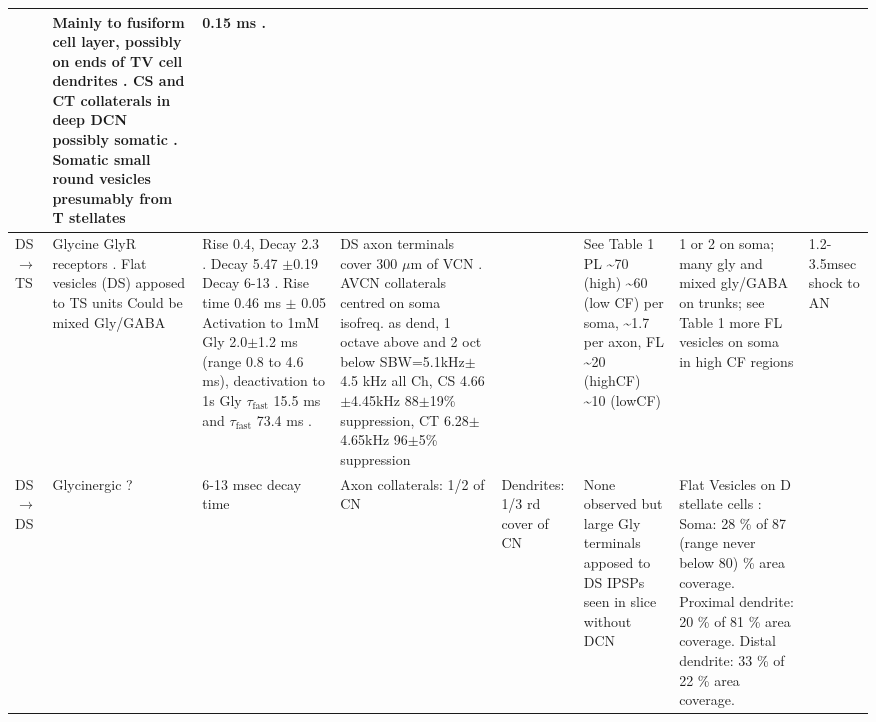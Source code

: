 \begin{longtable}{XXXXXXXX}
& %
Mainly to fusiform cell layer, possibly on ends of TV cell dendrites \citep[mouse][]{OertelWuEtAl:1990}. 
CS and CT collaterals in deep DCN possibly somatic \citep[guinea pig][]{PalmerWallaceEtAl:2003}.
Somatic small round vesicles presumably from T stellates  \citep[guinea pig][]{Alibardi:1999}   
& %
0.15 ms \citep[min EPSP latency to VCN Glutamate puffs, main excitation at 0.3 ms, AN shock produces late EPSPs about 3 msec][]{ZhangOertel:1993}.
\\ \midrule
DS\ensuremath{\rightarrow}TS                        
& %
Glycine GlyR receptors \citep[mouse][]{FerragamoGoldingEtAl:1998a}.
Flat vesicles (DS) apposed to TS units \citep[cat][]{SmithRhode:1989}     
Could be mixed Gly/GABA \citep{AltschulerJuizEtAl:1993} 
& %
Rise 0.4, Decay 2.3 \citep[half width of glyc mIPSCs, MNTB rat][]{AwatramaniTurecekEtAl:2005}.
Decay  5.47 $\pm$0.19 \citep[very young MNTB rat][]{AwatramaniTurecekEtAl:2005}
Decay 6-13 \citep[Slice prep 30 C degrees; VCN guinea pig][]{HartyManis:1998}.
Rise time 0.46 ms $\pm$ 0.05 \citep[spontaneous mIPSCs in AVCN bushy cells, mouse]{LimOleskevichEtAl:2003}
Activation to 1mM Gly 2.0$\pm$1.2 ms (range 0.8 to 4.6 ms), deactivation to 1s Gly $\tau_{\textrm{fast}}$ 15.5 ms and $\tau_{\textrm{fast}}$ 73.4 ms \citep[MNTB mouse][]{LeaoOleskevichEtAl:2004}.
& %
DS axon terminals cover 300 $\mu$m of VCN \citep[mouse][]{OertelWuEtAl:1990}.
AVCN collaterals centred on soma isofreq. as dend, 1 octave above and 2 oct below \citep[gerbil][]{ArnottWallaceEtAl:2004} 
SBW=5.1kHz$\pm$4.5 kHz all Ch, CS 4.66$\pm$4.45kHz 88$\pm$19\% suppression, CT 6.28$\pm$ 4.65kHz    96$\pm$5\% suppression \citep{RhodeGreenberg:1994b}
& %
 
& %
\citep{FerragamoGoldingEtAl:1998a} 
See Table 1 \citep{SmithRhode:1989} 
PL \~{}70 (high) \~{}60 (low CF) per soma, \~{}1.7 per axon, FL \~{}20 (highCF)
               \~{}10 (lowCF) \citep{JosephsonMorest:1998}                

& %
1 or 2 on soma; many gly and mixed gly/GABA on trunks; see Table 1\citep{SmithRhode:1989} more FL
    vesicles on soma in high CF regions \citep{JosephsonMorest:1998}      
& 
1.2-3.5msec shock to AN \citep{FerragamoGoldingEtAl:1998a,NeedhamPaolini:2003} \citep{Oertel:1983}
\\ \midrule
DS\ensuremath{\rightarrow}DS                        
& %
Glycinergic                   \citep{FerragamoGoldingEtAl:1998a}?                    
& %
6-13 msec decay time \citep{AwatramaniTurecekEtAl:2005,HartyManis:1996,HartyManis:1998,LeaoOleskevichEtAl:2004}
& %
Axon collaterals: 1/2 of CN
& %
Dendrites: 1/3 rd cover of CN
& %
None observed but large Gly terminals apposed to DS \citep[cat][]{SmithRhode:1989} 
IPSPs seen in slice without DCN \citep{FerragamoGoldingEtAl:1998a}                     
&    
Flat Vesicles on D stellate cells \citep[cat][]{SmithRhode:1989}:
Soma: 28 \%  of 87 (range never below 80) \% area coverage. 
Proximal dendrite: 20 \%  of 81 \% area coverage.  
Distal dendrite: 33 \%  of 22 \% area coverage.   


\end{longtable}
